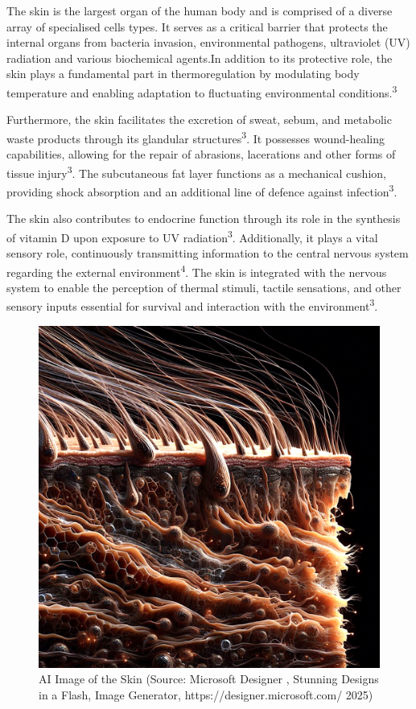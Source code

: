 \documentclass[
]{article}
\begin{document}
The skin is the largest organ of the human body and is comprised of a
diverse array of specialised cells types. It serves as a critical
barrier that protects the internal organs from bacteria invasion,
environmental pathogens, ultraviolet (UV) radiation and various
biochemical agents.In addition to its protective role, the skin plays a
fundamental part in thermoregulation by modulating body temperature and
enabling adaptation to fluctuating environmental
conditions.\textsuperscript{3}

Furthermore, the skin facilitates the excretion of sweat, sebum, and
metabolic waste products through its glandular
structures\textsuperscript{3}. It possesses wound-healing capabilities,
allowing for the repair of abrasions, lacerations and other forms of
tissue injury\textsuperscript{3}. The subcutaneous fat layer functions
as a mechanical cushion, providing shock absorption and an additional
line of defence against infection\textsuperscript{3}.

The skin also contributes to endocrine function through its role in the
synthesis of vitamin D upon exposure to UV radiation\textsuperscript{3}.
Additionally, it plays a vital sensory role, continuously transmitting
information to the central nervous system regarding the external
environment\textsuperscript{4}. The skin is integrated with the nervous
system to enable the perception of thermal stimuli, tactile sensations,
and other sensory inputs essential for survival and interaction with the
environment\textsuperscript{3}.

\begin{figure}

{\centering \includegraphics[width=0.7\linewidth]{Images/AI Skin 2025-06-11} 

}

\caption{AI Image of the Skin (Source: Microsoft Designer , Stunning Designs in a Flash, Image Generator, https://designer.microsoft.com/ 2025)}\label{fig:unnamed-chunk-8}
\end{figure}
\end{document}
